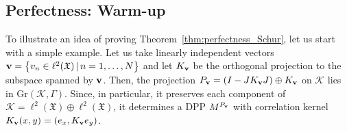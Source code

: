 \documentclass[pdftex]{sigma}
\numberwithin{equation}{section}
\newcommand{\mfrak}[1]{\mathfrak{#1}}
\newcommand{\mcal}[1]{\mathcal{#1}}
\newcommand{\mrm}[1]{\mathrm{#1}}
\begin{document}
\subsection{Perfectness: Warm-up}
To illustrate an idea of proving Theorem~\ref{thm:perfectness_Schur}, let us start with a simple example.
Let us take linearly independent vectors ${\bf v}=\big\{v_{n}\in\ell^{2}(\mfrak{X})\,|\, n=1,\dots, N\big\}$ and let $K_{{\bf v}}$ be the orthogonal projection to the subspace spanned by ${\bf v}$. Then, the projection $P_{{\bf v}}=(I-JK_{{\bf v}}J)\oplus K_{{\bf v}}$ on $\mcal{K}$ lies in $\mrm{Gr}(\mcal{K},\Gamma)$. Since, in particular, it preserves each component of $\mcal{K}=\ell^{2}(\mfrak{X})\oplus\ell^{2}(\mfrak{X})$, it determines a DPP $M^{P_{{\bf v}}}$ with correlation kernel $K_{{\bf v}}(x,y)=(e_{x},K_{{\bf v}}e_{y})$.
\end{document}
